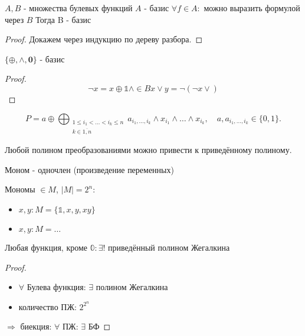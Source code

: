 \documentclass[a4paper, 12pt]{article}
\begin{document}
    \begin{lemma}
        $A, B$ - множества булевых функций
        $A$ - базис
        $\forall f \in A: $ можно выразить формулой через $B$
        Тогда B - базис
    \end{lemma}
    \begin{proof}
        Докажем через индукцию по дереву разбора.
    \end{proof}

    \begin{theorem}
        $\{ \oplus, \land, \bm{0} \}$ - базис        
    \end{theorem}
    \begin{proof}
        \begin{equation}
            \lnot x = x \oplus \mathbb{1}
            \land \in B
            x \lor y = \lnot (\lnot x \lor )
        \end{equation}
    \end{proof}

    \begin{definition}
        \begin{equation}
            P=a\oplus \bigoplus _{\begin{array}{c}1\leqslant i_{1}<\ldots <i_{k}\leqslant n\\k\in {\overline {1,n}}\end{array}}a_{i_{1},\ldots ,i_{k}}\wedge x_{i_{1}}\wedge \ldots \wedge x_{i_{k}},\quad a,a_{i_{1},\ldots ,i_{k}}\in \{0,1\}.
        \end{equation}
    \end{definition}

    Любой полином преобразованиями можно привести к приведённому полиному.

    \begin{definition}
        Моном - одночлен (произведение переменных)
    \end{definition}

    \begin{note}
        Мономы $\in M$, $|M| = 2^n$:

        \begin{itemize}
            \item $x, y: M = \{ \mathbb{1}, x, y, xy \}$
            \item $x, y: M = \dots$
        \end{itemize}
    \end{note}

    \begin{theorem}
        Любая функция, кроме $\mathbb{0}: \exists!$ приведённый полином Жегалкина
    \end{theorem}
    \begin{proof}
        \begin{itemize}
            \item $\forall$ Булева функция: $\exists$ полином Жегалкина
            \item количество ПЖ: $2^{2^n}$
        \end{itemize}
        $\Longrightarrow$ биекция: $\forall$ ПЖ: $\exists$ БФ
    \end{proof}
\end{document}

